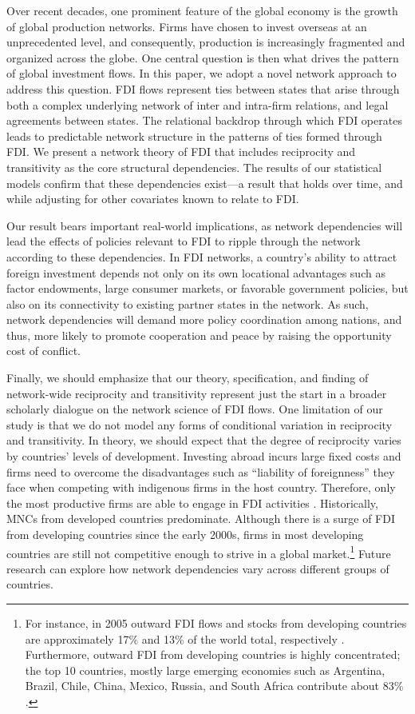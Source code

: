 \documentclass[reqno,onecolumn,letterpaper,12pt]{article}
\begin{document}
Over recent decades, one prominent feature of the global economy is the growth of global production networks. Firms have chosen to invest overseas at an unprecedented level, and consequently, production is increasingly fragmented and organized across the globe. One central question is then what drives the pattern of global investment flows. In this paper, we adopt a novel network approach to address this question. FDI flows represent ties between states that arise through both a complex underlying network of inter and intra-firm relations, and legal agreements between states. The relational backdrop through which FDI operates leads to predictable network structure in the patterns of ties formed through FDI. We present a network theory of FDI that includes reciprocity and transitivity as the core structural dependencies. The results of our statistical models confirm that these dependencies exist---a result that holds over time, and while adjusting for other covariates known to relate to FDI. 

Our result bears important real-world implications, as network dependencies will lead the effects of policies relevant to FDI to ripple through the network according to these dependencies. In FDI networks, a country's ability to attract foreign investment depends not only on its own locational advantages such as factor endowments, large consumer markets, or favorable government policies, but also on its connectivity to existing partner states in the network. As such, network dependencies will demand more policy coordination among nations, and thus, more likely to promote cooperation and peace by raising the opportunity cost of conflict.


Finally, we should emphasize that our theory, specification, and finding of network-wide reciprocity and transitivity represent just the start in a broader scholarly dialogue on the network science of FDI flows. One limitation of our study is that we do not model any forms of conditional variation in reciprocity and transitivity. In theory, we should expect that the degree of reciprocity varies by countries' levels of development. Investing abroad incurs large fixed costs and firms need to overcome the disadvantages such as ``liability of foreignness'' they face when competing with indigenous firms in the host country. Therefore, only the most productive firms are able to engage in FDI activities \citep{Melitz:2003,Helpman_et_al:2004}. Historically, MNCs from developed countries predominate. Although there is a surge of FDI from developing countries since the early 2000s, firms in most developing countries are still not competitive enough to strive in a global market.\footnote{For instance, in 2005 outward FDI flows and stocks from developing countries are approximately 17\% and 13\% of the world total, respectively \citep{UNCTAD:2006}. Furthermore, outward FDI from developing countries is highly concentrated; the top 10 countries, mostly large emerging economies such as Argentina, Brazil, Chile, China, Mexico, Russia, and South Africa contribute about 83\% \citep{UNCTAD:2006}. } Future research can explore how network dependencies vary across different groups of countries.
\end{document}
